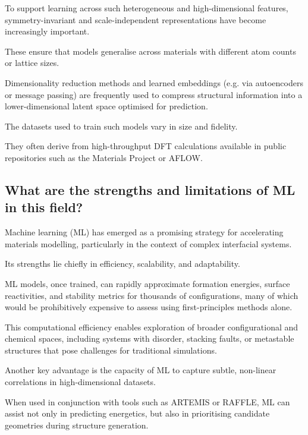 
To support learning across such heterogeneous and high-dimensional features, symmetry-invariant and scale-independent
representations have become increasingly important.

These ensure that models generalise across materials with different atom counts or lattice sizes.

Dimensionality reduction methods and learned embeddings (e.g. via autoencoders or message passing) are frequently used
to compress structural information into a lower-dimensional latent space optimised for prediction.



The datasets used to train such models vary in size and fidelity.

They often derive from high-throughput DFT calculations available in public repositories such as the Materials Project
or AFLOW.


\subsection{What are the strengths and limitations of ML in this field?}


Machine learning (ML) has emerged as a promising strategy for accelerating materials modelling, particularly in the
context of complex interfacial systems.

Its strengths lie chiefly in efficiency, scalability, and adaptability.

ML models, once trained, can rapidly approximate formation energies, surface reactivities, and stability metrics for
thousands of configurations, many of which would be prohibitively expensive to assess using first-principles methods
alone.

This computational efficiency enables exploration of broader configurational and chemical spaces, including systems with
disorder, stacking faults, or metastable structures that pose challenges for traditional simulations.


Another key advantage is the capacity of ML to capture subtle, non-linear correlations in high-dimensional datasets.

When used in conjunction with tools such as ARTEMIS or RAFFLE, ML can assist not only in predicting energetics, but also
in prioritising candidate geometries during structure generation.

